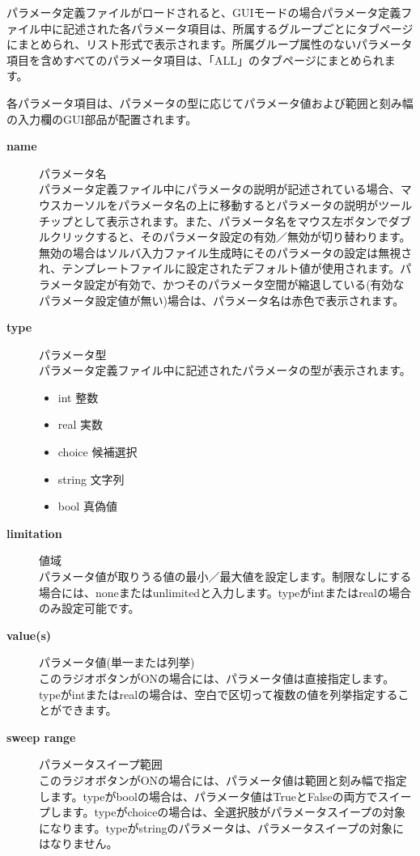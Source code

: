 \documentclass[a4paper,11pt]{jarticle}
\begin{document}
パラメータ定義ファイルがロードされると、GUIモードの場合パラメータ定義ファイル中に記述された各パラメータ項目は、所属するグループごとにタブページにまとめられ、リスト形式で表示されます。所属グループ属性のないパラメータ項目を含めすべてのパラメータ項目は、「ALL」のタブページにまとめられます。


各パラメータ項目は、パラメータの型に応じてパラメータ値および範囲と刻み幅の入力欄のGUI部品が配置されます。

\begin{description}
\item[{\bf name}] パラメータ名\\
パラメータ定義ファイル中にパラメータの説明が記述されている場合、マウスカーソルをパラメータ名の上に移動するとパラメータの説明がツールチップとして表示されます。また、パラメータ名をマウス左ボタンでダブルクリックすると、そのパラメータ設定の有効／無効が切り替わります。無効の場合はソルバ入力ファイル生成時にそのパラメータの設定は無視され、テンプレートファイルに設定されたデフォルト値が使用されます。パラメータ設定が有効で、かつそのパラメータ空間が縮退している(有効なパラメータ設定値が無い)場合は、パラメータ名は赤色で表示されます。

\item[{\bf type}] パラメータ型\\
パラメータ定義ファイル中に記述されたパラメータの型が表示されます。
\begin{itemize}
\item int 整数
\item real 実数
\item choice 候補選択
\item string 文字列
\item bool 真偽値
\end{itemize}

\item[{\bf limitation}] 値域\\
パラメータ値が取りうる値の最小／最大値を設定します。制限なしにする場合には、noneまたはunlimitedと入力します。typeがintまたはrealの場合のみ設定可能です。

\item[{\bf value(s)}] パラメータ値(単一または列挙)\\
このラジオボタンがONの場合には、パラメータ値は直接指定します。typeがintまたはrealの場合は、空白で区切って複数の値を列挙指定することができます。

\item[{\bf sweep range}] パラメータスイープ範囲\\
このラジオボタンがONの場合には、パラメータ値は範囲と刻み幅で指定します。typeがboolの場合は、パラメータ値はTrueとFalseの両方でスイープします。typeがchoiceの場合は、全選択肢がパラメータスイープの対象になります。typeがstringのパラメータは、パラメータスイープの対象にはなりません。


\end{description}
\end{document}
